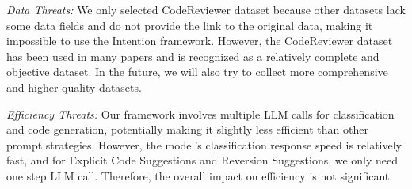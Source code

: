  \noindent \textit{Data Threats:} We only selected CodeReviewer dataset because other datasets lack some data fields and do not provide the link to the original data, making it impossible to use the Intention framework. However, the CodeReviewer dataset has been used in many papers and is recognized as a relatively complete and objective dataset. In the future, we will also try to collect more comprehensive and higher-quality datasets.

 \noindent \textit{Efficiency Threats:} Our framework involves multiple LLM calls for classification and code generation, potentially making it slightly less efficient than other prompt strategies. However, the model’s classification response speed is relatively fast, and for Explicit Code Suggestions and Reversion Suggestions, we only need one step LLM call. Therefore, the overall impact on efficiency is not significant.



